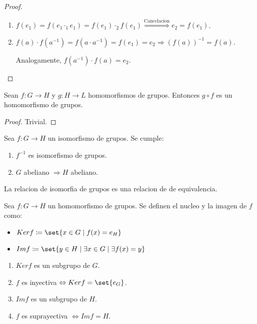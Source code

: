 \begin{proof}
	\begin{enumerate}
		\item \(f(e_1) = f(e_1 \cdot_1 e_1) = f(e_1) \cdot_2 f(e_1) \overset{\text{Cancelacion}}{\Rightarrow} e_2 = f(e_1)\).
		\item \(f(a) \cdot f(a^{-1} ) = f(a \cdot a^{-1} )=  f(e_1) = e_2 \Rightarrow (f(a))^{-1} = f(a)\).
		      
		      Analogamente, \(f(a^{-1} ) \cdot f(a ) = e_2 \).
		      
	\end{enumerate}
\end{proof}
\begin{proposition}
	Sean \(f \colon G \to H \) y \(g \colon H \to L \) homomorfismos de grupos. Entonces \(g \circ f \) es un homomorfismo de grupos.
\end{proposition}
\begin{proof}
	Trivial.
\end{proof}
\begin{proposition}
	Sea \(f \colon G \to H \) un isomorfismo de grupos. Se cumple:
	\begin{enumerate}
		\item \(f^{-1} \) es isomorfismo de grupos.
		\item \(G \) abeliano \(\Rightarrow H \) abeliano.
	\end{enumerate}
\end{proposition}
\begin{proposition}
	La relacion de isomorfia de grupos es una relacion de de equivalencia.
\end{proposition}
\begin{definition}
	Sea \(f \colon G \to H \) un homomorfismo de grupos. Se definen el nucleo y la imagen de \(f \) como:
	\begin{itemize}
		\item \(Kerf \coloneqq \set{x \in G \mid f(x) = e_H }\)
		\item \(Imf \coloneqq \set{y \in H \mid \exists x \in G \mid \exists f(x) = y }\)
	\end{itemize}
\end{definition}
\begin{proposition}
	\begin{enumerate}
		\item \(Kerf \) es un subgrupo de \(G \).
		\item \(f \) es inyectiva \(\iff  Kerf = \set{e_G }\).
		\item \(Imf \) es un subgrupo de \(H \).
		\item \(f \) es suprayectiva \(\iff Imf = H \).
	\end{enumerate}
\end{proposition}
